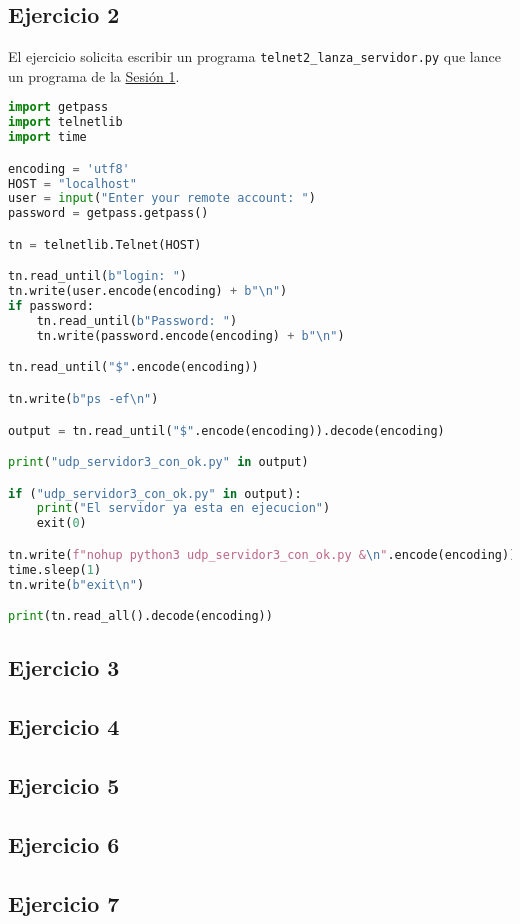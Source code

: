 \subsection{Ejercicio 2}

El ejercicio solicita escribir un programa \lstinline{telnet2_lanza_servidor.py}
que lance un programa de la \hyperref[Servicios básicos]{Sesión 1}.

\begin{lstlisting}[language=Python]
import getpass
import telnetlib
import time

encoding = 'utf8'
HOST = "localhost"
user = input("Enter your remote account: ")
password = getpass.getpass()

tn = telnetlib.Telnet(HOST)

tn.read_until(b"login: ")
tn.write(user.encode(encoding) + b"\n")
if password:
    tn.read_until(b"Password: ")
    tn.write(password.encode(encoding) + b"\n")

tn.read_until("$".encode(encoding))

tn.write(b"ps -ef\n")

output = tn.read_until("$".encode(encoding)).decode(encoding)

print("udp_servidor3_con_ok.py" in output)

if ("udp_servidor3_con_ok.py" in output):
    print("El servidor ya esta en ejecucion")
    exit(0)

tn.write(f"nohup python3 udp_servidor3_con_ok.py &\n".encode(encoding))
time.sleep(1)
tn.write(b"exit\n")

print(tn.read_all().decode(encoding))
\end{lstlisting}

\subsection{Ejercicio 3}
\subsection{Ejercicio 4}
\subsection{Ejercicio 5}
\subsection{Ejercicio 6}
\subsection{Ejercicio 7}
